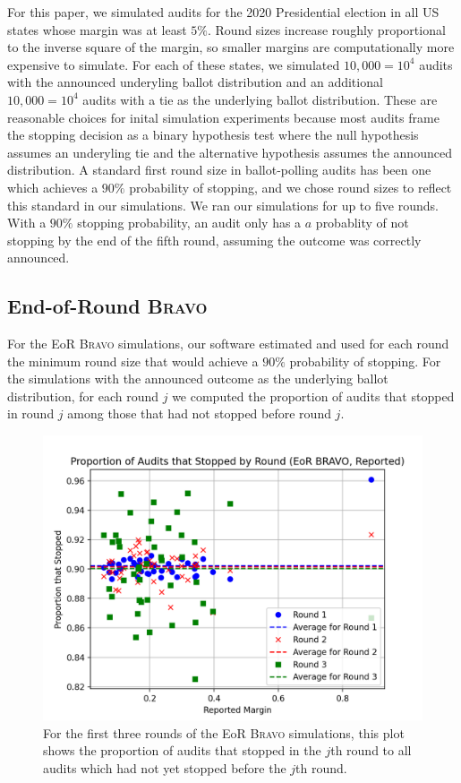 \documentclass[runningheads]{llncs}
\newcommand{\BRAVO}{\textsc{Bravo}\xspace}
\begin{document}
For this paper, we simulated audits for 
the 2020 Presidential election
in all US states whose margin was at least $5\%$.
Round sizes increase roughly proportional to the inverse
square of the margin, so 
smaller margins are computationally more expensive to simulate.
For each of these states, we simulated 
$10,000=10^4$ audits with the announced
underyling ballot distribution
and an additional $10,000=10^4$ audits with a tie
as the underlying ballot distribution.
These are reasonable choices for inital simulation experiments
because most audits frame the stopping decision as a binary
hypothesis test where the null hypothesis assumes an underyling tie
and the alternative hypothesis assumes the announced distribution.
A standard first round size in ballot-polling audits
has been one which achieves a $90\%$ probability
of stopping, and we chose round sizes to reflect this standard
in our simulations.
We ran our simulations for up to five rounds.
With a $90\%$ stopping probability, 
an audit only has a $a$ probablity of not stopping
by the end of the fifth round, assuming the outcome was correctly
announced.

\subsection{End-of-Round \BRAVO}
For the EoR \BRAVO simulations, our software estimated and used for each round
the minimum round size that would achieve a $90\%$ probability of stopping.
For the simulations with the announced outcome as the underlying
ballot distribution, for each round $j$ we computed the proportion of audits 
that stopped in round $j$ among those that had not stopped before round $j$.

\begin{figure}[H]
\includegraphics[width=\textwidth]{eor_bravo_90perc_10^4_corrected/sprob_first_three.png}\caption{
For the first three rounds of the EoR \BRAVO simulations, this plot shows the proportion of audits that stopped in the $j$th round
to all audits which had not yet stopped before the $j$th round.}
\label{fig:eor_bravo_sprob}
\end{figure}
\end{document}
